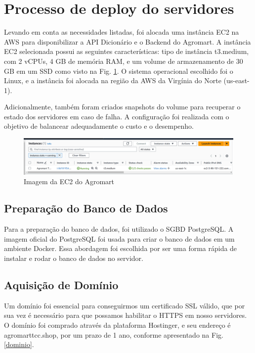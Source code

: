 \section{Processo de deploy do servidores}
Levando em conta as necessidades listadas, foi alocada uma instância EC2 na AWS para disponibilizar a API Dicionário e o Backend do Agromart. A instância EC2 selecionada possui as seguintes características: tipo de instância t3.medium, com 2 vCPUs, 4 GB de memória RAM, e um volume de armazenamento de 30 GB em um SSD como visto na Fig. \ref{ec2}. O sistema operacional escolhido foi o Linux, e a instância foi alocada na região da AWS da Virgínia do Norte (us-east-1).

Adicionalmente, também foram criados snapshots do volume para recuperar o estado dos servidores em caso de falha. A configuração foi realizada com o objetivo de balancear adequadamente o custo e o desempenho.

\begin{figure}[h]
        \centering
        \includegraphics[keepaspectratio=true,scale=0.3]{figuras/ec2_agromart.png}
        \caption{Imagem da EC2 do Agromart}
        \label{ec2}
\end{figure}

\subsection{Preparação do Banco de Dados}
Para a preparação do banco de dados, foi utilizado o SGBD PostgreSQL. A imagem oficial do PostgreSQL foi usada para criar o banco de dados em um ambiente Docker. Essa abordagem foi escolhida por ser uma forma rápida de instalar e rodar o banco de dados no servidor.

\subsection{Aquisição de Domínio}
Um domínio foi essencial para conseguirmos um certificado SSL válido, que por sua vez é necessário para que possamos habilitar o HTTPS em nosso servidores. O domínio foi comprado através da plataforma Hostinger, e seu endereço é agromarttcc.shop, por um prazo de 1 ano, conforme apresentado na Fig. \ref{dominio}. 

